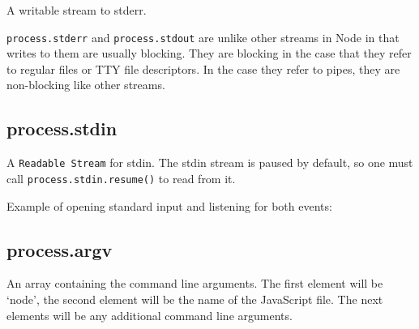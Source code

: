 A writable stream to stderr.

\texttt{process.stderr} and \texttt{process.stdout} are unlike other
streams in Node in that writes to them are usually blocking. They are
blocking in the case that they refer to regular files or TTY file
descriptors. In the case they refer to pipes, they are non-blocking like
other streams.

\subsection{process.stdin}

A \texttt{Readable Stream} for stdin. The stdin stream is paused by
default, so one must call \texttt{process.stdin.resume()} to read from
it.

Example of opening standard input and listening for both events:

\begin{Shaded}
\begin{Highlighting}[]
\NormalTok{();}
\NormalTok{(}\NormalTok{);}

\NormalTok{(}\NormalTok{, }
  \NormalTok{(} 
\NormalTok{\});}

\NormalTok{(}\NormalTok{, }\NormalTok{() \{}
  \NormalTok{(}\NormalTok{);}
\NormalTok{\});}
\end{Highlighting}
\end{Shaded}

\subsection{process.argv}

An array containing the command line arguments. The first element will
be `node', the second element will be the name of the JavaScript file.
The next elements will be any additional command line arguments.

\begin{Shaded}
\begin{Highlighting}[]
\NormalTok{(}
   
\NormalTok{\});}
\end{Highlighting}
\end{Shaded}

